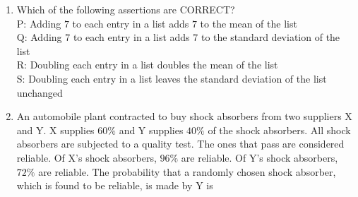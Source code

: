 \documentclass[journal]{IEEEtran}
\begin{document}
\begin{enumerate}
\item Which of the following assertions are CORRECT? \\
P: Adding $7$ to each entry in a list adds $7$ to the mean of the list \\
Q: Adding $7$ to each entry in a list adds $7$ to the standard deviation of the list \\
R: Doubling each entry in a list doubles the mean of the list \\
S: Doubling each entry in a list leaves the standard deviation of the list unchanged \hfill {}
\begin{enumerate}
\end{enumerate}

\item An automobile plant contracted to buy shock absorbers from two suppliers X and Y. X supplies $60\%$ and Y supplies $40\%$ of the shock absorbers. All shock absorbers are subjected to a quality test. The ones that pass are considered reliable. Of X's shock absorbers, $96\%$ are reliable. Of Y's shock absorbers, $72\%$ are reliable. The probability that a randomly chosen shock absorber, which is found to be reliable, is made by Y is \hfill {}
\begin{enumerate}
\end{enumerate}


\end{enumerate}
\end{document}
